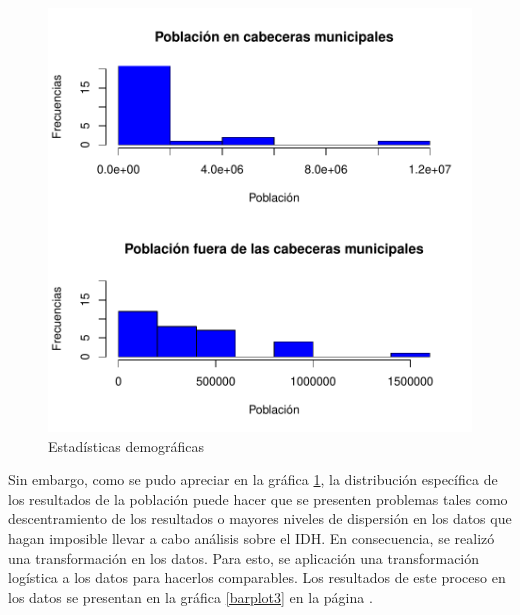 \documentclass{article}
\begin{document}
\begin{figure}[h]
\centering
\includegraphics{Articulo1-histPOB}
\caption{Estadísticas demográficas}
\label{barplot2}
\end{figure}

Sin embargo, como se pudo apreciar en la gráfica \ref{barplot2}, la distribución específica de los resultados de la población puede hacer que se presenten problemas tales como descentramiento de los resultados o mayores niveles de dispersión en los datos que hagan imposible llevar a cabo análisis sobre el IDH. En consecuencia, se realizó una transformación en los datos. Para esto, se aplicación una transformación logística a los datos para hacerlos comparables. Los resultados de este proceso en los datos se presentan en la gráfica \ref{barplot3} en la página \pageref{barplot3}.
\clearpage
\end{document}
